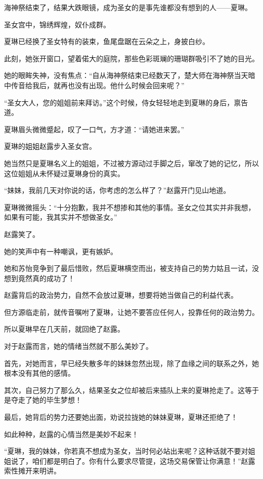 
\begin{this_body}

海神祭结束了，结果大跌眼镜，成为圣女的是事先谁都没有想到的人——夏琳。

圣女宫中，锦绣辉煌，奴仆成群。

夏琳已经换了圣女特有的装束，鱼尾盘踞在云朵之上，身披白纱。

此刻，她张开窗口，望着偌大的庭院，那些色彩斑斓的珊瑚群吸引不了她的目光。

她的眼眸失神，没有焦点：“自从海神祭结束已经数天了，楚大师在海神祭当天暗中传音给我后，就再也没有出现。他什么时候会回来呢？”

“圣女大人，您的姐姐前来拜访。”这个时候，侍女轻轻地走到夏琳的身后，禀告道。

夏琳眉头微微蹙起，叹了一口气，方才道：“请她进来罢。”

夏琳的姐姐赵露步入圣女宫。

她当然只是夏琳名义上的姐姐，不过被方源动过手脚之后，窜改了她的记忆，所以这位姐姐从未怀疑过夏琳身份的真实。

“妹妹，我前几天对你说的话，你考虑的怎么样了？”赵露开门见山地道。

夏琳微微摇头：“十分抱歉，我并不想掺和其他的事情。圣女之位其实并非我想，如果有可能，我其实并不想做圣女。”

赵露笑了。

她的笑声中有一种嘲讽，更有嫉妒。

她和苏怡竞争到了最后惜败，然后夏琳横空而出，被支持自己的势力姑且一试，没想到竟然真的成功了！

赵露背后的政治势力，自然不会放过夏琳，想要将她当做自己的利益代表。

但方源临走前，就传音嘱咐了夏琳，让她不要答应任何人，投靠任何的政治势力。

所以夏琳早在几天前，就回绝了赵露。

对于赵露而言，她的情绪当然就不那么美妙了。

首先，对她而言，早已经失散多年的妹妹忽然出现，除了血缘之间的联系之外，她根本没有其他的感情。

其次，自己努力了那么久，结果圣女之位却被后来插队上来的夏琳抢走了。这等于是夺走了她的毕生梦想！

最后，她背后的势力还要她出面，劝说拉拢她的妹妹夏琳，夏琳还拒绝了！

如此种种，赵露的心情当然是美妙不起来！

“夏琳，我的妹妹，你若真不想成为圣女，当时何必站出来呢？这种话就不要对姐姐说了，咱们都是明白了。你有什么要求尽管提，这场交易保管让你满意！”赵露索性摊开来明讲。


\end{this_body}
